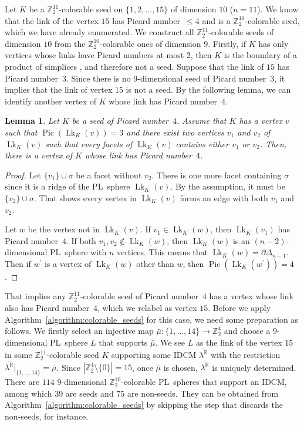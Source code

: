 \documentclass[11pt]{amsart}
\theoremstyle{plain}
\newtheorem{lemma}[theorem]{Lemma}
\numberwithin{equation}{section}
\theoremstyle{definition}
\newcommand{\R}{\mathbb{R}}
\newcommand{\Z}{\mathbb{Z}}
\DeclareMathOperator{\Pic}{Pic}
\DeclareMathOperator{\Lk}{Lk}
\begin{document}
Let $K$ be a $\Z_2^{11}$-colorable seed on $\{1, 2, \ldots, 15 \}$ of dimension $10$ ($n=11$).
We know that the link of the vertex $15$ has Picard number~$\leq 4$ and is a $\Z_2^{10}$-colorable seed, which we have already enumerated.
We construct all $\Z_2^{11}$-colorable seeds of dimension $10$ from the $\Z_2^{10}$-colorable ones of dimension $9$.
Firstly, if $K$ has only vertices whose links have Picard numbers at most 2, then $K$ is the boundary of a product of simplices \cite{Grunbaum2003}, and therefore not a seed.
Suppose that the link of $15$ has Picard number~$3$.
Since there is no $9$-dimensional seed of Picard number~$3$, it implies that the link of vertex $15$ is not a seed.
By the following lemma, we can identify another vertex of $K$ whose link has Picard number~$4$.
\begin{lemma}
	Let $K$ be a seed of Picard number~$4$.
	Assume that $K$ has a vertex $v$ such that $\Pic(\Lk_K(v)) = 3$ and there exist two vertices $v_1$ and $v_2$ of $\Lk_K(v)$ such that every facets of $\Lk_K(v)$ contains either $v_1$ or $v_2$.
	Then, there is a vertex of $K$ whose link has Picard number~$4$.
\end{lemma}
\begin{proof}
	Let $\{v_1\} \cup \sigma$ be a facet without $v_2$.
	There is one more facet containing $\sigma$ since it is a ridge of the PL~sphere $\Lk_K(v)$.
	By the assumption, it must be $\{v_2\} \cup \sigma$.
	That shows every vertex in $\Lk_K(v)$ forms an edge with both $v_1$ and $v_2$.
	
	Let $w$ be the vertex not in $\Lk_K(v)$.
	If $v_1 \in \Lk_K(w)$, then $\Lk_K(v_1)$ has Picard number~$4$.
	If both $v_1, v_2 \not\in \Lk_K(w)$, then $\Lk_K(w)$ is an $(n-2)$-dimensional PL~sphere with $n$ vertices.
    This means that $\Lk_K(w) = \partial\Delta_{n-1}$.
    Then if $w^\prime$ is a vertex of $\Lk_K(w)$ other than $w$, then $\Pic(\Lk_K(w^\prime)) = 4$.
\end{proof}
That implies any $\Z_2^{11}$-colorable seed of Picard number~$4$ has a vertex whose link also has Picard number~$4$, which we relabel as vertex $15$.
Before we apply Algorithm~\ref{algorithm:colorable_seeds} for this case, we need some preparation as follows.
We firstly select an injective map $\bar{\mu}\colon \{1,\ldots, 14\} \to \Z_2^4$ and choose a $9$-dimensional PL~sphere $L$ that supports $\bar{\mu}$.
We see $L$ as the link of the vertex $15$ in some $\Z_2^{11}$-colorable seed $K$ supporting some IDCM $\overline{\lambda^\R}$ with the restriction $\overline{\lambda^\R} \vert_{\{1,\ldots, 14\}} = \bar{\mu}$.
Since $\left| \Z_2^4  \setminus \{0\}\right| = 15$, once $\bar{\mu}$ is chosen, $\overline{\lambda^\R}$ is uniquely determined.
There are $114$ $9$-dimensional $\Z_2^{10}$-colorable PL~spheres that support an IDCM, among which $39$ are seeds and $75$ are non-seeds. They can be obtained from Algorithm~\ref{algorithm:colorable_seeds} by skipping the step that discards the non-seeds, for instance.
\end{document}
